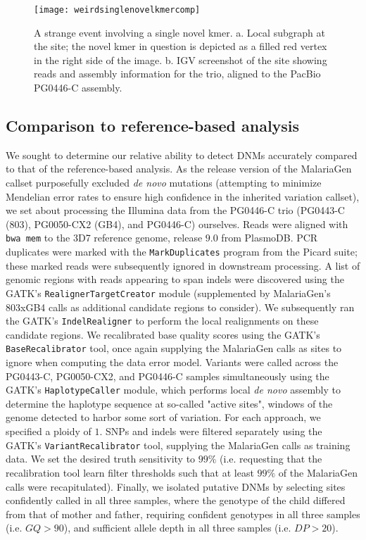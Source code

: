 \begin{sidewaysfigure}[h!]
  \centering
    \texttt{[image: weirdsinglenovelkmercomp]}
  \caption{A strange event involving a single novel kmer.  a. Local subgraph at the site; the novel kmer in question is depicted as a filled red vertex in the right side of the image.  b. IGV screenshot of the site showing reads and assembly information for the trio, aligned to the PacBio PG0446-C assembly.}
  \label{fig:weirdsinglenovelkmercomp}
\end{sidewaysfigure}

\subsection{Comparison to reference-based analysis}

We sought to determine our relative ability to detect DNMs accurately compared to that of the reference-based analysis.  As the release version of the MalariaGen callset purposefully excluded \textit{de novo} mutations (attempting to minimize Mendelian error rates to ensure high confidence in the inherited variation callset), we set about processing the Illumina data from the PG0446-C trio (PG0443-C (803), PG0050-CX2 (GB4), and PG0446-C) ourselves.  Reads were aligned with \texttt{bwa mem} to the 3D7 reference genome, release $9.0$ from PlasmoDB.  PCR duplicates were marked with the \texttt{MarkDuplicates} program from the Picard suite; these marked reads were subsequently ignored in downstream processing.  A list of genomic regions with reads appearing to span indels were discovered using the GATK's \texttt{RealignerTargetCreator} module (supplemented by MalariaGen's 803xGB4 calls as additional candidate regions to consider).  We subsequently ran the GATK's \texttt{IndelRealigner} to perform the local realignments on these candidate regions.  We recalibrated base quality scores using the GATK's \texttt{BaseRecalibrator} tool, once again supplying the MalariaGen calls as sites to ignore when computing the data error model.  Variants were called across the PG0443-C, PG0050-CX2, and PG0446-C samples simultaneously using the GATK's \texttt{HaplotypeCaller} module, which performs local \textit{de novo} assembly to determine the haplotype sequence at so-called "active sites", windows of the genome detected to harbor some sort of variation.  For each approach, we specified a ploidy of $1$.  SNPs and indels were filtered separately using the GATK's \texttt{VariantRecalibrator} tool, supplying the MalariaGen calls as training data.  We set the desired truth sensitivity to $99\%$ (i.e. requesting that the recalibration tool learn filter thresholds such that at least $99\%$ of the MalariaGen calls were recapitulated).  Finally, we isolated putative DNMs by selecting sites confidently called in all three samples, where the genotype of the child differed from that of mother and father, requiring confident genotypes in all three samples (i.e. $GQ > 90$), and sufficient allele depth in all three samples (i.e. $DP > 20$).

